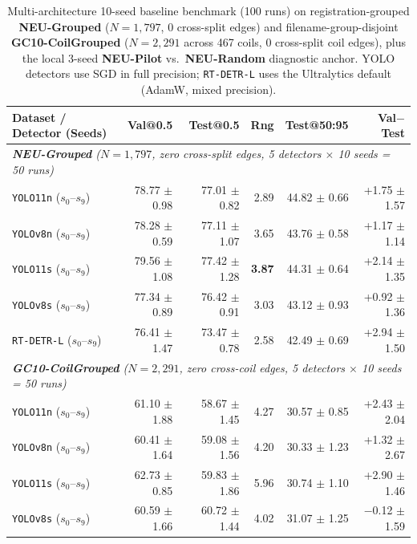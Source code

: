 \documentclass[pdflatex,sn-apa]{sn-jnl}
\begin{document}
\begin{table}[htbp]
\centering
\footnotesize
\setlength{\tabcolsep}{2.5pt}
\caption{Multi-architecture 10-seed baseline benchmark (100 runs) on registration-grouped \textbf{NEU-Grouped} ($N=1,797$, 0 cross-split edges) and filename-group-disjoint \textbf{GC10-CoilGrouped} ($N=2,291$ across 467 coils, 0 cross-split coil edges), plus the local 3-seed \textbf{NEU-Pilot} vs.\ \textbf{NEU-Random} diagnostic anchor. YOLO detectors use SGD in full precision; \texttt{RT-DETR-L} uses the Ultralytics default (AdamW, mixed precision).}
\label{tab:bench_results}
\begin{tabular*}{\textwidth}{@{\extracolsep{\fill}} l r r r r r}
\toprule
\textbf{Dataset / Detector (Seeds)} & \textbf{Val@0.5} & \textbf{Test@0.5} & \textbf{Rng} & \textbf{Test@50:95} & \textbf{Val$-$Test} \\
\midrule
\multicolumn{6}{l}{\textit{\textbf{NEU-Grouped} ($N=1,797$, zero cross-split edges, 5 detectors $\times$ 10 seeds = 50 runs)}} \\
\texttt{YOLO11n} ($s_0$--$s_9$) & 78.77 $\pm$ 0.98 & 77.01 $\pm$ 0.82 & 2.89 & 44.82 $\pm$ 0.66 & +1.75 $\pm$ 1.57 \\
\texttt{YOLOv8n} ($s_0$--$s_9$) & 78.28 $\pm$ 0.59 & 77.11 $\pm$ 1.07 & 3.65 & 43.76 $\pm$ 0.58 & +1.17 $\pm$ 1.14 \\
\texttt{YOLO11s} ($s_0$--$s_9$) & 79.56 $\pm$ 1.08 & 77.42 $\pm$ 1.28 & \textbf{3.87} & 44.31 $\pm$ 0.64 & +2.14 $\pm$ 1.35 \\
\texttt{YOLOv8s} ($s_0$--$s_9$) & 77.34 $\pm$ 0.89 & 76.42 $\pm$ 0.91 & 3.03 & 43.12 $\pm$ 0.93 & +0.92 $\pm$ 1.36 \\
\texttt{RT-DETR-L} ($s_0$--$s_9$) & 76.41 $\pm$ 1.47 & 73.47 $\pm$ 0.78 & 2.58 & 42.49 $\pm$ 0.69 & +2.94 $\pm$ 1.50 \\
\midrule
\multicolumn{6}{l}{\textit{\textbf{GC10-CoilGrouped} ($N=2,291$, zero cross-coil edges, 5 detectors $\times$ 10 seeds = 50 runs)}} \\
\texttt{YOLO11n} ($s_0$--$s_9$) & 61.10 $\pm$ 1.88 & 58.67 $\pm$ 1.45 & 4.27 & 30.57 $\pm$ 0.85 & +2.43 $\pm$ 2.04 \\
\texttt{YOLOv8n} ($s_0$--$s_9$) & 60.41 $\pm$ 1.64 & 59.08 $\pm$ 1.56 & 4.20 & 30.33 $\pm$ 1.23 & +1.32 $\pm$ 2.67 \\
\texttt{YOLO11s} ($s_0$--$s_9$) & 62.73 $\pm$ 0.85 & 59.83 $\pm$ 1.86 & 5.96 & 30.74 $\pm$ 1.10 & +2.90 $\pm$ 1.46 \\
\texttt{YOLOv8s} ($s_0$--$s_9$) & 60.59 $\pm$ 1.66 & 60.72 $\pm$ 1.44 & 4.02 & 31.07 $\pm$ 1.25 & $-$0.12 $\pm$ 1.59 \\

\end{tabular*}
\end{table}
\end{document}
